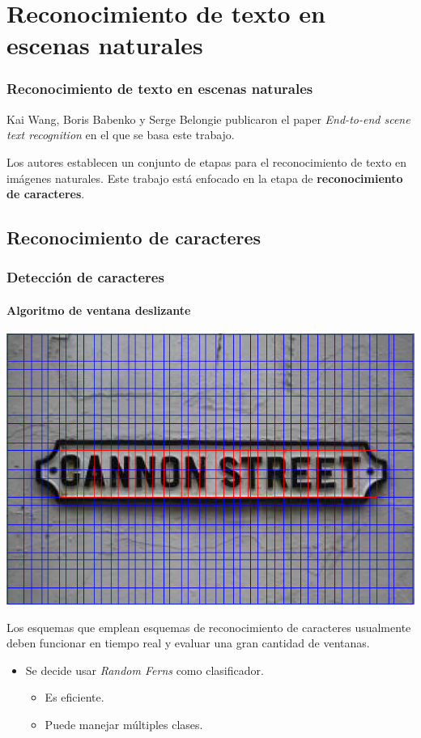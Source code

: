 \section{Reconocimiento de texto en escenas naturales}
	\begin{frame}
		\frametitle{Reconocimiento de texto en escenas naturales}
		Kai Wang, Boris Babenko y Serge Belongie publicaron el paper \textit{End-to-end scene text recognition} en el que se basa este trabajo.
		
		Los autores establecen un conjunto de etapas para el reconocimiento de texto en imágenes naturales. Este trabajo está enfocado en la etapa de \textbf{reconocimiento de caracteres}.
	\end{frame}
	\subsection{Reconocimiento de caracteres}
		\begin{frame}
			\frametitle{Detección de caracteres}
			\framesubtitle{Algoritmo de ventana deslizante}
			\begin{center}
				\includegraphics[height=0.65\paperheight]{imgs/ventana_deslizante.png}
			\end{center}
		\end{frame}
		\begin{frame}
			Los esquemas que emplean esquemas de reconocimiento de caracteres usualmente deben funcionar en tiempo real y evaluar una gran cantidad de ventanas.
			\begin{itemize}
				\item<1->[] Se decide usar \textit{Random Ferns} como clasificador.
					\begin{itemize}
						\item<2-> Es eficiente.
						\item<3-> Puede manejar múltiples clases.
					\end{itemize}
			\end{itemize}
		\end{frame}
